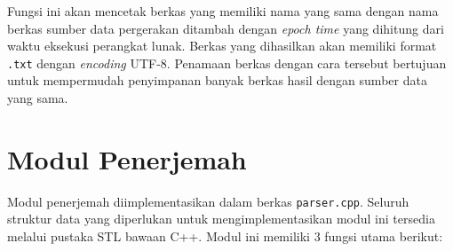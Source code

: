 \begin{enumerate}
    Fungsi ini akan mencetak berkas yang memiliki nama yang sama dengan nama berkas sumber data pergerakan ditambah dengan \textit{epoch time} yang dihitung dari waktu eksekusi perangkat lunak. Berkas yang dihasilkan akan memiliki format \texttt{.txt} dengan \textit{encoding} UTF-8. Penamaan berkas dengan cara tersebut bertujuan untuk mempermudah penyimpanan banyak berkas hasil dengan sumber data yang sama. 
\end{enumerate}

\section{Modul Penerjemah}
\label{sec:impl-parser}

Modul penerjemah diimplementasikan dalam berkas \texttt{parser.cpp}. Seluruh struktur data yang diperlukan untuk mengimplementasikan modul ini tersedia melalui pustaka STL bawaan C++. Modul ini memiliki 3 fungsi utama berikut:


